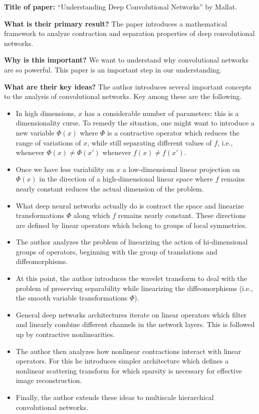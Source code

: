 \noindent \textbf{Title of paper:} ``Understanding Deep Convolutional Networks''
by Mallat.

\noindent\textbf{What is their primary result?} The paper introduces a
mathematical framework to analyze contraction and separation properties of deep
convolutional networks. 

\noindent\textbf{Why is this important?} We want to understand why convolutional
networks are so powerful. This paper is an important step in our understanding. 

\noindent\textbf{What are their key ideas?} The author introduces several
important concepts to the analysis of convolutional networks. Key among these
are the following.
\begin{itemize}[noitemsep]
\item In high dimensions, $x$ has a considerable number of parameters; this is a
  dimensionality curse. To remedy the situation, one might want to introduce a
  new variable $\Phi(x)$ where $\Phi$ is a contractive operator which reduces
  the range of variations of $x$, while still separating different values of
  $f$, i.e., whenever $\Phi(x)\neq\Phi(x')$ whenever $f(x)\neq f(x')$.
\item Once we have less variability on $x$ a low-dimensional linear projection
  on $\Phi(x)$ in the direction of a high-dimensional linear space where $f$
  remains nearly constant reduces the actual dimension of the problem.
\item What deep neural networks actually do is contract the space and linearize
  transformations $\Phi$ along which $f$ remains nearly constant. These
  directions are defined by linear operators which belong to groups of local
  symmetries.
\item The author analyzes the problem of linearizing the action of
  hi-dimensional groups of operators, beginning with the group of translations
  and diffeomorphisms.
\item At this point, the author introduces the wavelet transform to deal with
  the problem of preserving separability while linearizing the diffeomorphisms
  (i.e., the smooth variable transformations $\Phi$).
\item General deep networks architectures iterate on linear operators which
  filter and linearly combine different channels in the network layers. This is
  followed up by contractive nonlinearities.
\item The author then analyzes how nonlinear contractions interact with linear
  operators. For this he introduces simpler architecture which defines a
  nonlinear scattering transform for which sparsity is necessary for effective
  image reconstruction.
\item Finally, the author extends these ideas to multiscale hierarchical
  convolutional networks. 
\end{itemize}

